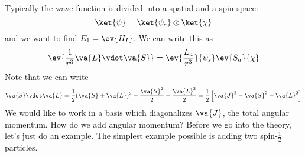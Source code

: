 \documentclass[a4paper,twoside,master.tex]{subfiles}
\begin{document}
Typically the wave function is divided into a spatial and a spin space:
\begin{equation}
    \ket{\psi} =\ket{\psi_s} \otimes\ket{\chi}
\end{equation}
and we want to find $ E_1 = \ev{H_I} $. We can write this as
\begin{equation}
    \ev{\frac{1}{r^3} \va{L} \vdot \va{S}} = \ev{\frac{L_a}{r^3}}{\psi_s} \ev{S_a}{\chi}
\end{equation}
Note that we can write
\begin{equation}
    \va{S} \vdot \va{L} = \frac{1}{2} (\va{S} + \va{L})^2 - \frac{\va{S}^2}{2} - \frac{\va{L}^2}{2} = \frac{1}{2} \left[ \va{J}^2 - \va{S}^2 - \va{L}^2 \right]
\end{equation}
We would like to work in a basis which diagonalizes $ \va{J} $, the total angular momentum. How do we add angular momentum? Before we go into the theory, let's just do an example. The simplest example possible is adding two spin-$ \frac{1}{2} $ particles.
\end{document}
